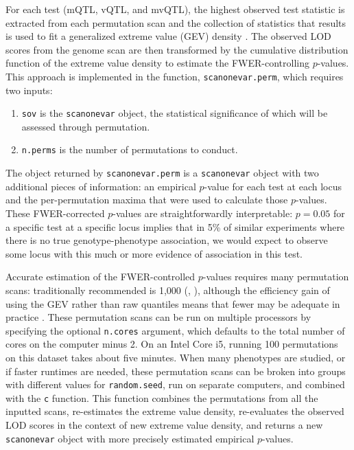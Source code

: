 \documentclass[9pt,twocolumn,twoside]{gsag3jnl}
\begin{document}
For each test (mQTL, vQTL, and mvQTL), the highest observed test statistic is extracted from each permutation scan and the collection of statistics that results is used to fit a generalized extreme value (GEV) density \citep{Stephenson2002,Dudbridge2004,Valdar06cc}.
The observed LOD scores from the genome scan are then transformed by the cumulative distribution function of the extreme value density to estimate the FWER-controlling $p$-values.
This approach is implemented in the function, \texttt{scanonevar.perm}, which requires two inputs:
\begin{enumerate}
	\item \texttt{sov} is the \texttt{scanonevar} object, the statistical significance of which will be assessed through permutation.
	\item \texttt{n.perms} is the number of permutations to conduct.
\end{enumerate}
The object returned by \texttt{scanonevar.perm} is a \texttt{scanonevar} object with two additional pieces of information: an empirical $p$-value for each test at each locus and the per-permutation maxima that were used to calculate those $p$-values.
These FWER-corrected $p$-values are straightforwardly interpretable: $p = 0.05$ for a specific test at a specific locus implies that in 5\% of similar experiments where there is no true genotype-phenotype association, we would expect to observe some locus with this much or more evidence of association in this test.

Accurate estimation of the FWER-controlled $p$-values requires many permutation scans: traditionally recommended is 1,000 (\eg, \citealt{Churchill1994,Carlborg2002}), although the efficiency gain of using the GEV rather than raw quantiles means that fewer may be adequate in practice \citep{Valdar06cc}.
These permutation scans can be run on multiple processors by specifying the optional \texttt{n.cores} argument, which defaults to the total number of cores on the computer minus 2.
On an Intel Core i5, running 100 permutations on this dataset takes about five minutes.
When many phenotypes are studied, or if faster runtimes are needed, these permutation scans can be broken into groups with different values for \texttt{random.seed}, run on separate computers, and combined with the \texttt{c} function.
This function combines the permutations from all the inputted scans, re-estimates the extreme value density, re-evaluates the observed LOD scores in the context of new extreme value density, and returns a new \texttt{scanonevar} object with more precisely estimated empirical $p$-values.
\end{document}
